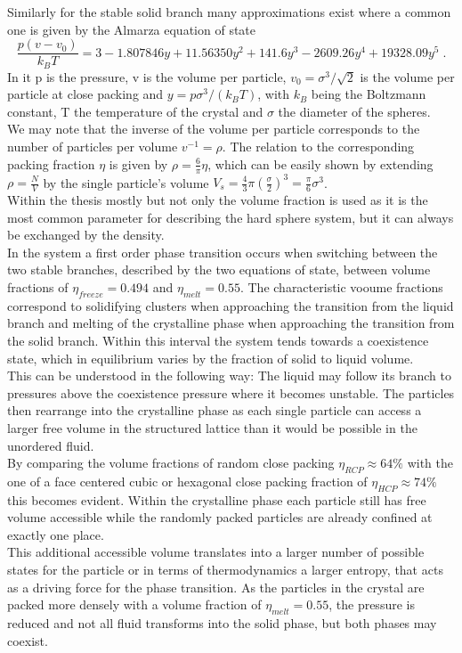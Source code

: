 Similarly for the stable solid branch many approximations exist where a common one is given by the Almarza equation of state\cite{Almarza2009}
\begin{equation}
\frac{p(v-v_0)}{k_B T} = 3 - 1.807846 y + 11.56350 y^2 + 141.6 y^3 - 2609.26 y^4 + 19328.09 y^5 \; \text{.}
\end{equation}
In it p is the pressure, v is the volume per particle, $v_0=\sigma^3/\sqrt{2}$ is the volume per particle at close packing and $y=p \sigma^3 / (k_B T)$, with $k_B$ being the Boltzmann constant, T the temperature of the crystal and $\sigma$ the diameter of the spheres.\\
We may note that the inverse of the volume per particle corresponds to the number of particles per volume $ v^{-1} = \rho$. The relation to the corresponding packing fraction $\eta$ is given by $\rho = \frac{6}{ \pi} \eta$, which can be easily shown by extending $\rho = \frac{N}{V}$ by the single particle's volume $V_s = \frac{4}{3} \pi \left(\frac{\sigma}{2}\right)^3 = \frac{\pi}{6} \sigma^3$.\\
Within the thesis mostly but not only the volume fraction is used as it is the most common parameter for describing the hard sphere system, but it can always be exchanged by the density.\\ 

In the system a first order phase transition occurs when switching between the two stable branches, described by the two equations of state, between volume fractions of $\eta_{freeze} = 0.494$ and $\eta_{melt}=0.55$. The characteristic vooume fractions correspond to solidifying clusters when approaching the transition from the liquid branch and melting of the crystalline phase when approaching the transition from the solid branch. Within this interval the system tends towards a coexistence state, which in equilibrium varies by the fraction of solid to liquid volume.\\
This can be understood in the following way: The liquid may follow its branch to pressures above the coexistence pressure where it becomes unstable. The particles then rearrange into the crystalline phase as each single particle can access a larger free volume in the structured lattice than it would be possible in the unordered fluid.\\
By comparing the volume fractions of random close packing $\eta_{RCP}\approx 64\%$ with the one of a face centered cubic or hexagonal close packing fraction of $\eta_{HCP} \approx 74 \%$ this becomes evident. Within the crystalline phase each particle still has free volume accessible while the randomly packed particles are already confined at exactly one place.\\
This additional accessible volume translates into a larger number of possible states for the particle or in terms of thermodynamics a larger entropy, that acts as a driving force for the phase transition. As the particles in the crystal are packed more densely with a volume fraction of $\eta_{melt}=0.55$, the pressure is reduced and not all fluid transforms into the solid phase, but both phases may coexist.\\

